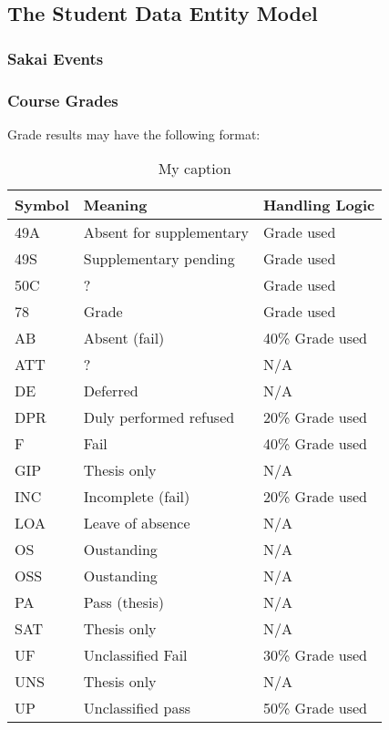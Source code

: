 \subsection{The Student Data Entity Model}

\subsubsection*{Sakai Events}


\subsubsection*{Course Grades}

Grade results may have the following format:

\begin{table}[]
    \centering
    \caption{My caption}
    \label{my-label}
    \begin{tabular}{lll}
        Symbol & Meaning                  & Handling Logic  \\ \hline
        49A    & Absent for supplementary & Grade used      \\
        49S    & Supplementary pending    & Grade used      \\
        50C    & ?                        & Grade used      \\
        78     & Grade                    & Grade used      \\
        AB     & Absent (fail)            & 40\% Grade used \\
        ATT    & ?                        & N/A             \\
        DE     & Deferred                 & N/A             \\
        DPR    & Duly performed refused   & 20\% Grade used \\
        F      & Fail                     & 40\% Grade used \\
        GIP    & Thesis only              & N/A             \\
        INC    & Incomplete (fail)        & 20\% Grade used \\
        LOA    & Leave of absence         & N/A             \\
        OS     & Oustanding               & N/A             \\
        OSS    & Oustanding               & N/A             \\
        PA     & Pass (thesis)            & N/A             \\
        SAT    & Thesis only              & N/A             \\
        UF     & Unclassified Fail        & 30\% Grade used \\
        UNS    & Thesis only              & N/A             \\
        UP     & Unclassified pass        & 50\% Grade used \\ \hline
    \end{tabular}
\end{table}



